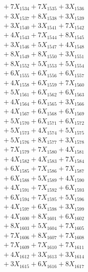 \documentclass[a4paper,10pt]{article}
\begin{document}
{\begin{align}
&\;  + 7 X_{1534} + 7 X_{1535} + 3 X_{1536} \\[0.3ex]
&\;  + 3 X_{1537} + 8 X_{1538} + 3 X_{1539} \\[0.5ex]\allowbreak
&\;  + 3 X_{1540} + 3 X_{1541} + 7 X_{1542} \\[0.3ex]
&\;  + 4 X_{1543} + 7 X_{1544} + 8 X_{1545} \\[0.3ex]
&\;  + 3 X_{1546} + 5 X_{1547} + 4 X_{1548} \\[0.3ex]
&\;  + 8 X_{1549} + 8 X_{1550} + 3 X_{1551} \\[0.3ex]
&\;  + 8 X_{1552} + 5 X_{1553} + 5 X_{1554} \\[0.3ex]
&\;  + 6 X_{1555} + 6 X_{1556} + 6 X_{1557} \\[0.3ex]
&\;  + 4 X_{1558} + 6 X_{1559} + 7 X_{1560} \\[0.3ex]
&\;  + 5 X_{1561} + 6 X_{1562} + 6 X_{1563} \\[0.3ex]
&\;  + 4 X_{1564} + 6 X_{1565} + 3 X_{1566} \\[0.3ex]
&\;  + 4 X_{1567} + 6 X_{1568} + 6 X_{1569} \\[0.5ex]\allowbreak
&\;  + 5 X_{1570} + 6 X_{1571} + 6 X_{1572} \\[0.3ex]
&\;  + 5 X_{1573} + 4 X_{1574} + 5 X_{1575} \\[0.3ex]
&\;  + 5 X_{1576} + 8 X_{1577} + 3 X_{1578} \\[0.3ex]
&\;  + 7 X_{1579} + 7 X_{1580} + 4 X_{1581} \\[0.3ex]
&\;  + 4 X_{1582} + 4 X_{1583} + 7 X_{1584} \\[0.3ex]
&\;  + 6 X_{1585} + 7 X_{1586} + 7 X_{1587} \\[0.3ex]
&\;  + 6 X_{1588} + 5 X_{1589} + 4 X_{1590} \\[0.3ex]
&\;  + 4 X_{1591} + 7 X_{1592} + 6 X_{1593} \\[0.3ex]
&\;  + 6 X_{1594} + 7 X_{1595} + 5 X_{1596} \\[0.3ex]
&\;  + 4 X_{1597} + 6 X_{1598} + 3 X_{1599} \\[0.5ex]\allowbreak
&\;  + 4 X_{1600} + 8 X_{1601} + 6 X_{1602} \\[0.3ex]
&\;  + 8 X_{1603} + 5 X_{1604} + 7 X_{1605} \\[0.3ex]
&\;  + 7 X_{1606} + 8 X_{1607} + 7 X_{1608} \\[0.3ex]
&\;  + 7 X_{1609} + 7 X_{1610} + 7 X_{1611} \\[0.3ex]
&\;  + 4 X_{1612} + 3 X_{1613} + 3 X_{1614} \\[0.3ex]
&\;  + 3 X_{1615} + 6 X_{1616} + 8 X_{1617} \\[0.3ex]

\end{align}}
\end{document}
